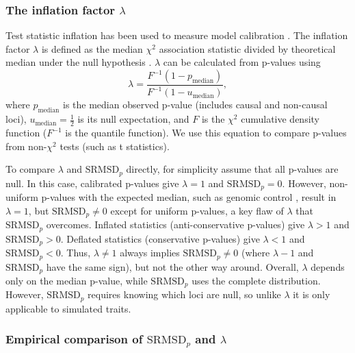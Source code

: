 \documentclass[11pt]{article}
\newcommand{\rmsd}{\text{SRMSD}_p}
\begin{document}
\subsubsection{The inflation factor $\lambda$}

Test statistic inflation has been used to measure model calibration \citep{astle_population_2009, price_new_2010}.
The inflation factor $\lambda$ is defined as the median $\chi^2$ association statistic divided by theoretical median under the null hypothesis \citep{devlin_genomic_1999}.
$\lambda$ can be calculated from p-values using
$$
\lambda
=
\frac{
  F^{-1} \left( 1 - p_\text{median} \right)
}{
  F^{-1} \left( 1 - u_\text{median} \right)
}
,
$$
where $p_\text{median}$ is the median observed p-value (includes causal and non-causal loci),
$u_\text{median} = \frac{1}{2}$ is its null expectation,
and $F$ is the $\chi^2$ cumulative density function ($F^{-1}$ is the quantile function).
We use this equation to compare p-values from non-$\chi^2$ tests (such as t statistics).

To compare $\lambda$ and $\rmsd$ directly, for simplicity assume that all p-values are null.
In this case, calibrated p-values give $\lambda = 1$ and $\rmsd = 0$.
However, non-uniform p-values with the expected median, such as genomic control \citep{devlin_genomic_1999}, result in $\lambda = 1$, but $\rmsd \ne 0$ except for uniform p-values, a key flaw of $\lambda$ that $\rmsd$ overcomes.
Inflated statistics (anti-conservative p-values) give $\lambda > 1$ and $\rmsd > 0$.
Deflated statistics (conservative p-values) give $\lambda < 1$ and $\rmsd < 0$.
Thus, $\lambda \ne 1$ always implies $\rmsd \ne 0$ (where $\lambda - 1$ and $\rmsd$ have the same sign), but not the other way around.
Overall, $\lambda$ depends only on the median p-value, while $\rmsd$ uses the complete distribution.
However, $\rmsd$ requires knowing which loci are null, so unlike $\lambda$ it is only applicable to simulated traits.

\subsubsection{Empirical comparison of $\rmsd$ and $\lambda$}
\end{document}
